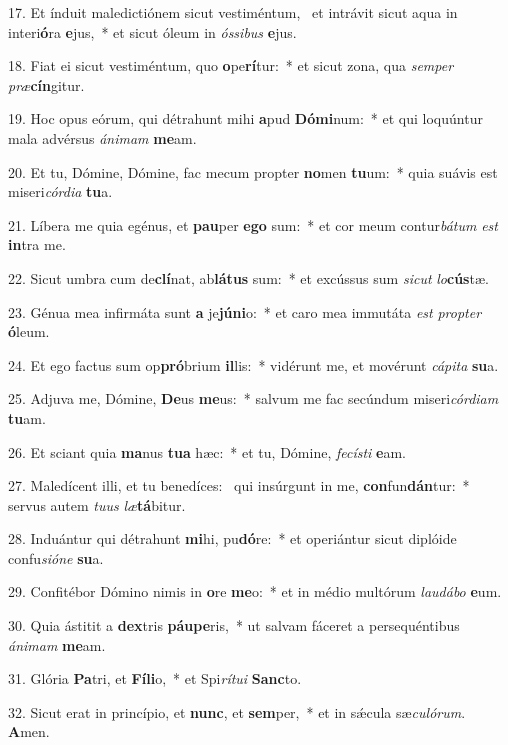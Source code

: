 17. Et índuit maledictiónem sicut vestiméntum, \dag\  et intrávit sicut aqua in interi\textbf{ó}ra \textbf{e}jus,~*  et sicut óleum in \textit{ós}\textit{si}\textit{bus} \textbf{e}jus.\

18. Fiat ei sicut vestiméntum, quo \textbf{o}pe\textbf{rí}tur:~*  et sicut zona, qua \textit{sem}\textit{per} \textit{præ}\textbf{cín}gitur.\

19. Hoc opus eórum, qui détrahunt mihi \textbf{a}pud \textbf{Dó}\textbf{mi}num:~*  et qui loquúntur mala advérsus \textit{á}\textit{ni}\textit{mam} \textbf{me}am.\

20. Et tu, Dómine, Dómine, fac mecum propter \textbf{no}men \textbf{tu}um:~*  quia suávis est miseri\textit{cór}\textit{di}\textit{a} \textbf{tu}a.\

21. Líbera me quia egénus, et \textbf{pau}per \textbf{e}\textbf{go} sum:~*  et cor meum contur\textit{bá}\textit{tum} \textit{est} \textbf{in}tra me.\

22. Sicut umbra cum de\textbf{clí}nat, ab\textbf{lá}\textbf{tus} sum:~*  et excússus sum \textit{sic}\textit{ut} \textit{lo}\textbf{cús}tæ.\

23. Génua mea infirmáta sunt \textbf{a} je\textbf{jú}\textbf{ni}o:~*  et caro mea immutáta \textit{est} \textit{prop}\textit{ter} \textbf{ó}leum.\

24. Et ego factus sum op\textbf{pró}brium \textbf{il}lis:~*  vidérunt me, et movérunt \textit{cá}\textit{pi}\textit{ta} \textbf{su}a.\

25. Adjuva me, Dómine, \textbf{De}us \textbf{me}us:~*  salvum me fac secúndum miseri\textit{cór}\textit{di}\textit{am} \textbf{tu}am.\

26. Et sciant quia \textbf{ma}nus \textbf{tu}\textbf{a} hæc:~*  et tu, Dómine, \textit{fe}\textit{cís}\textit{ti} \textbf{e}am.\

27. Maledícent illi, et tu benedíces: \dag\  qui insúrgunt in me, \textbf{con}fun\textbf{dán}tur:~*  servus autem \textit{tu}\textit{us} \textit{læ}\textbf{tá}bitur.\

28. Induántur qui détrahunt \textbf{mi}hi, pu\textbf{dó}re:~*  et operiántur sicut diplóide confu\textit{si}\textit{ó}\textit{ne} \textbf{su}a.\

29. Confitébor Dómino nimis in \textbf{o}re \textbf{me}o:~*  et in médio multórum \textit{lau}\textit{dá}\textit{bo} \textbf{e}um.\

30. Quia ástitit a \textbf{dex}tris \textbf{páu}\textbf{pe}ris,~*  ut salvam fáceret a persequéntibus \textit{á}\textit{ni}\textit{mam} \textbf{me}am.\

31. Glória \textbf{Pa}tri, et \textbf{Fí}\textbf{li}o,~*  et Spi\textit{rí}\textit{tu}\textit{i} \textbf{Sanc}to.\

32. Sicut erat in princípio, et \textbf{nunc}, et \textbf{sem}per,~*  et in sǽcula sæ\textit{cu}\textit{ló}\textit{rum}. \textbf{A}men.\

